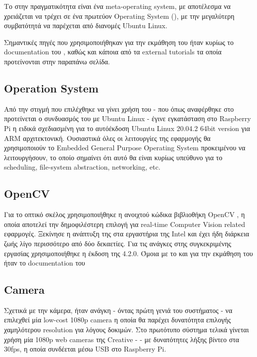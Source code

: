 Το  στην πραγματικότητα είναι ένα meta-operating system, με αποτέλεσμα να χρειάζεται να τρέχει σε ένα πρωτεύον Operating System (), με την μεγαλύτερη συμβατότητά να παρέχεται από διανομές Ubuntu Linux. 

Σημαντικές πηγές που χρησιμοποιήθηκαν για την εκμάθηση του  ήταν κυρίως το documentation του \cite{ros-doc}, καθώς και κάποια από τα external tutorials τα οποία προτείνονται στην παραπάνω σελίδα.

\subsection{Operation System}
Από την στιγμή που επιλέχθηκε να γίνει χρήση του  - που όπως αναφέρθηκε στο  προτείνεται ο συνδυασμός του με Ubuntu Linux - έγινε εγκατάσταση στο Raspberry Pi η ειδικά σχεδιασμένη για το αυτό\udot έκδοση Ubuntu Linux 20.04.2 64bit version για ΑRM \cite{ubuntu-raspberry} αρχιτεκτονική. Ουσιαστικά όλες οι λειτουργίες της εφαρμογής θα χρησιμοποιούν το Embedded General Purpose Operating System προκειμένου να λειτουργήσουν, το οποίο σημαίνει ότι αυτό θα είναι κυρίως υπεύθυνο για το scheduling, file-system abstraction, networking, etc. 

\subsection{OpenCV}
Για το οπτικό σκέλος χρησιμοποιήθηκε η ανοιχτού κώδικα βιβλιοθήκη OpenCV \cite{opencv}, η οποία αποτελεί την δημοφιλέστερη επιλογή για real-time Computer Vision related εφαρμογές. Ξεκίνησε η ανάπτυξη της στα εργαστήρια της Intel και έχει ήδη διάρκεια ζωής λίγο περισσότερο από δύο δεκαετίες. Για τις ανάγκες στης συγκεκριμένης εργασίας χρησιμοποιήθηκε η έκδοση της 4.2.0. Όμοια με το  και για την εκμάθηση του  ήταν το documentation του

\subsection{Camera}
Σχετικά με την κάμερα, ήταν ανάγκη - όντας πρώτη γενιά του συστήματος -  να επιλεχθεί μία low-cost 1080p camera η οποία θα παρέχει δυνατότητα επιλογής χαμηλότερου resolution για λόγους δοκιμών. Στο πρωτότυπο σύστημα τελικά γίνεται χρήση μία 1080p web cameras της Creative \cite{creative-camera} -  - με δυνατότητες λήξης βίντεο στα 30fps, η οποία συνδέεται μέσω USB στο Raspberry Pi.

